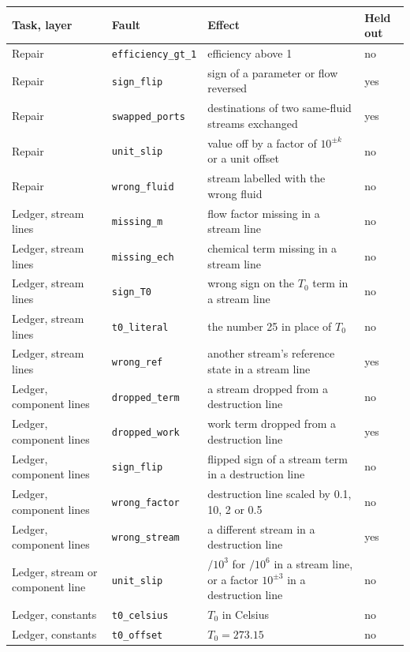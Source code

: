 \begingroup\small\renewcommand{\arraystretch}{1.12}
\begin{tabular}{@{}p{3.3cm}p{3.0cm}p{7.2cm}l@{}}
\toprule
Task, layer & Fault & Effect & Held out \\
\midrule
Repair & \texttt{efficiency\_gt\_1} & efficiency above 1 & no \\
Repair & \texttt{sign\_flip} & sign of a parameter or flow reversed & yes \\
Repair & \texttt{swapped\_ports} & destinations of two same-fluid streams exchanged & yes \\
Repair & \texttt{unit\_slip} & value off by a factor of $10^{\pm k}$ or a unit offset & no \\
Repair & \texttt{wrong\_fluid} & stream labelled with the wrong fluid & no \\
\midrule
Ledger, stream lines & \texttt{missing\_m} & flow factor missing in a stream line & no \\
Ledger, stream lines & \texttt{missing\_ech} & chemical term missing in a stream line & no \\
Ledger, stream lines & \texttt{sign\_T0} & wrong sign on the $T_0$ term in a stream line & no \\
Ledger, stream lines & \texttt{t0\_literal} & the number 25 in place of $T_0$ & no \\
Ledger, stream lines & \texttt{wrong\_ref} & another stream's reference state in a stream line & yes \\
Ledger, component lines & \texttt{dropped\_term} & a stream dropped from a destruction line & no \\
Ledger, component lines & \texttt{dropped\_work} & work term dropped from a destruction line & yes \\
Ledger, component lines & \texttt{sign\_flip} & flipped sign of a stream term in a destruction line & no \\
Ledger, component lines & \texttt{wrong\_factor} & destruction line scaled by 0.1, 10, 2 or 0.5 & no \\
Ledger, component lines & \texttt{wrong\_stream} & a different stream in a destruction line & yes \\
Ledger, stream or component line & \texttt{unit\_slip} & $/10^3$ for $/10^6$ in a stream line, or a factor $10^{\pm3}$ in a destruction line & no \\
Ledger, constants & \texttt{t0\_celsius} & $T_0$ in Celsius & no \\
Ledger, constants & \texttt{t0\_offset} & $T_0 = 273.15$ & no \\
\bottomrule
\end{tabular}\endgroup
